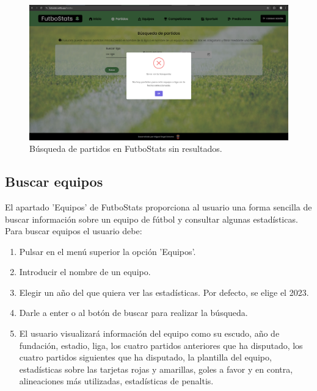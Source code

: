 \begin{figure}[H]
    \centering
    \includegraphics[width=1\linewidth]{img/partidosError-UM.png}
    \caption{Búsqueda de partidos en FutboStats sin resultados.}
    \label{fig:enter-label}
\end{figure}

\subsection{Buscar equipos}
El apartado 'Equipos' de FutboStats proporciona al usuario una forma sencilla de buscar información sobre un equipo de fútbol y consultar algunas estadísticas. \\
Para buscar equipos el usuario debe:
\begin{enumerate}
    \item Pulsar en el menú superior la opción 'Equipos'.
    \item Introducir el nombre de un equipo.
    \item Elegir un año del que quiera ver las estadísticas. Por defecto, se elige el 2023.
    \item Darle a enter o al botón de buscar para realizar la búsqueda.
    \item El usuario visualizará información del equipo como su escudo, año de fundación, estadio, liga, los cuatro partidos anteriores que ha disputado, los cuatro partidos siguientes que ha disputado, la plantilla del equipo, estadísticas sobre las tarjetas rojas y amarillas, goles a favor y en contra, alineaciones más utilizadas, estadísticas de penaltis.
\end{enumerate}

